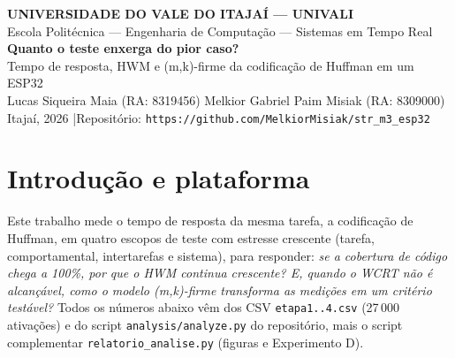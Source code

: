\documentclass[11pt,a4paper]{article}
\begin{document}
\thispagestyle{empty}
\begin{center}
{\large\bfseries UNIVERSIDADE DO VALE DO ITAJAÍ --- UNIVALI}\\
Escola Politécnica --- Engenharia de Computação --- Sistemas em Tempo Real\\[5pt]
{\Large\bfseries Quanto o teste enxerga do pior caso?}\\
{\large Tempo de resposta, HWM e (m,k)-firme da codificação de Huffman em um ESP32}\\[4pt]
Lucas Siqueira Maia (RA: 8319456) \quad Melkior Gabriel Paim Misiak (RA: 8309000)\\

Itajaí, 2026 \quad|\quad Repositório: \texttt{https://github.com/MelkiorMisiak/str\_m3\_esp32}
\end{center}
\vspace{-4pt}

\section{Introdução e plataforma}
Este trabalho mede o tempo de resposta da mesma tarefa, a codificação de Huffman, em quatro escopos de teste com estresse crescente (tarefa, comportamental, intertarefas e sistema), para responder: \emph{se a cobertura de código chega a 100\%, por que o HWM continua crescente? E, quando o WCRT não é alcançável, como o modelo (m,k)-firme transforma as medições em um critério testável?} Todos os números abaixo vêm dos CSV \texttt{etapa1..4.csv} (27\,000 ativações) e do script \texttt{analysis/analyze.py} do repositório, mais o script complementar \texttt{relatorio\_analise.py} (figuras e Experimento D).
\end{document}
